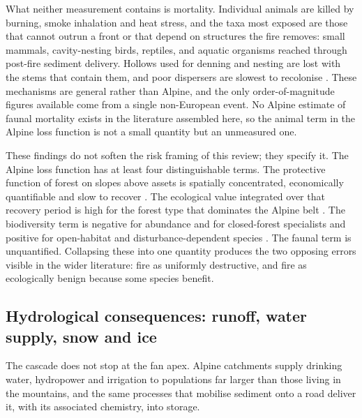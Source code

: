 \documentclass[11pt,a4paper]{article}
\begin{document}
What neither measurement contains is mortality. Individual animals are killed by burning, smoke inhalation and heat stress, and the taxa most exposed are those that cannot outrun a front or that depend on structures the fire removes: small mammals, cavity-nesting birds, reptiles, and aquatic organisms reached through post-fire sediment delivery. Hollows used for denning and nesting are lost with the stems that contain them, and poor dispersers are slowest to recolonise \citep{demiguel_fires_2021}. These mechanisms are general rather than Alpine, and the only order-of-magnitude figures available come from a single non-European event. No Alpine estimate of faunal mortality exists in the literature assembled here, so the animal term in the Alpine loss function is not a small quantity but an unmeasured one.

These findings do not soften the risk framing of this review; they specify it. The Alpine loss function has at least four distinguishable terms. The protective function of forest on slopes above assets is spatially concentrated, economically quantifiable \citep{moos_climate_2021} and slow to recover \citep{stritih_alternative_2023, degiuli_arrested_2024}. The ecological value integrated over that recovery period is high for the forest type that dominates the Alpine belt \citep{arrogantefunes_mapping_2024}. The biodiversity term is negative for abundance and for closed-forest specialists and positive for open-habitat and disturbance-dependent species \citep{rey_effects_2019, degiuli_arrested_2024}. The faunal term is unquantified. Collapsing these into one quantity produces the two opposing errors visible in the wider literature: fire as uniformly destructive, and fire as ecologically benign because some species benefit.

\subsection{Hydrological consequences: runoff, water supply, snow and ice}

The cascade does not stop at the fan apex. Alpine catchments supply drinking water, hydropower and irrigation to populations far larger than those living in the mountains, and the same processes that mobilise sediment onto a road deliver it, with its associated chemistry, into storage.
\end{document}
